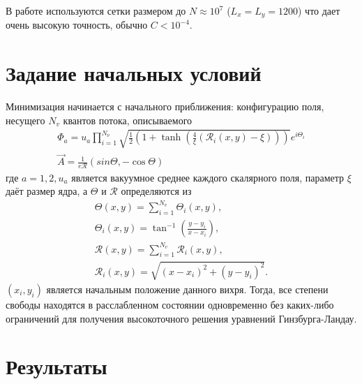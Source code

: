В работе используются сетки размером до \( N \approx 10^7 \) 
(\( L_x = L_y = 1200 \)) что дает очень высокую точность, обычно 
\( C < 10^{-4} \). \cite{bib:minimization}

\section{Задание начальных условий}

Минимизация начинается с начального приближения: конфигурацию поля, несущего
\( N_v \) квантов потока, описываемого
\begin{gather}
    \Phi_a = u_a \prod\limits_{i=1}^{N_\nu} \sqrt{ 
        \frac{1}{2}\left( 1 + \tanh\left( 
            \frac{4}{\xi}\left( \mathcal{R}_i(x,y) - \xi \right)
        \right) \right)
    } e^{i\Theta_i}
    \nonumber \\
    \vec{A} = \frac{1}{e\mathcal{R}}\left( sin\Theta, -\cos\Theta \right)
    \label{eqm:6}
\end{gather}
где \( a = 1,2, u_a \) является вакуумное среднее каждого скалярного поля, 
параметр \( \xi \) даёт размер ядра, а \( \Theta \) и
\( \mathcal{R} \) определяются из
\begin{gather}
    \Theta(x,y) = \sum\limits_{i=1}^{N_v} \Theta_i(x,y), \nonumber \\
    \Theta_i(x,y) = \tan^{-1}\left(\frac{y-y_i}{x-x_i} \right), \nonumber \\
    \mathcal{R}(x,y) = \sum\limits_{i=1}^{N_v} \mathcal{R}_i(x,y), \nonumber \\
    \mathcal{R}_i(x,y) = \sqrt{(x-x_i)^2+(y-y_i)^2}.
\end{gather}
\( (x_i,y_i) \) является начальным положение данного вихря. Тогда, все степени 
свободы находятся в расслабленном состоянии одновременно без каких-либо 
ограничений для получения высокоточного решения уравнений Гинзбурга-Ландау.
\cite{bib:minimization}

\section{Результаты}

\newpage